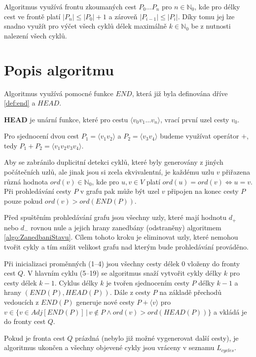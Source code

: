     Algoritmus využívá frontu zkoumaných cest $P_0 \dots P_n$ pro $n \in \mathbb{N}_0$, kde pro délky cest ve frontě platí $|P_n| \leq |P_0| + 1$ a zároveň $|P_{i-1}| \leq |P_{i}|$. Díky tomu jej lze snadno využít pro výčet všech cyklů délek maximálně $k \in \mathbb{N}_0$ be z nutnosti nalezení všech cyklů.

    \section{Popis algoritmu}
        Algoritmus využívá pomocné funkce $\mathit{END}$, která již byla definována dříve \ref{def:end} a $\mathit{HEAD}$.

        \begin{definition}
            \textbf{HEAD} je unární funkce, které pro cestu $\langle v_0 v_1 \dots v_n \rangle$, vrací první uzel cesty $v_0$.\\
        \end{definition}

        Pro sjednocení dvou cest $P_1 = \langle v_1v_2 \rangle$ a $P_2 = \langle v_3v_4 \rangle$ budeme využívat operátor $+$, tedy $P_1 + P_2 = \langle v_1v_2v_3v_4 \rangle$.

        Aby se zabránilo duplicitní detekci cyklů, které byly generovány z jiných počátečních uzlů, ale jinak jsou si zcela ekvivalentní, je každému uzlu $v$ přiřazena různá hodnota $ord(v) \in \mathbb{N}_0$, kde pro $u, v \in V$ platí $ord(u) = ord(v) \iff u = v$. Při prohledávání cesty $P$ v grafu pak může být uzel $v$ připojen na konec cesty $P$ pouze pokud $ord(v) > ord(END(P))$.

        Před spuštěním prohledávání grafu jsou všechny uzly, které mají hodnotu $d_+$ nebo $d_-$ rovnou nule a jejich hrany zanedbány (odstraněny) algoritmem \ref{algo:ZanedbaniStavu}. Cílem tohoto kroku je eliminovat uzly, které nemohou tvořit cykly a tím snížit velikost grafu nad kterým bude prohledávání prováděno.

        Při inicializaci proměnných (1--4) jsou všechny cesty délek 0 vloženy do fronty cest $Q$. V hlavním cyklu (5--19) se algoritmus snaží vytvořit cykly délky $k$ pro cesty délek $k-1$. Cyklus délky $k$ je tvořen sjednocením cesty $P$ délky $k-1$ a hrany $(END(P), HEAD(P))$. Dále z cesty $P$ na základě přechodů vedoucích z $END(P)$ generuje nové cesty $P + \langle v \rangle$ pro $v \in \{v \in Adj[END(P)] \,|\, v \notin P \land ord(v) > ord(HEAD(P))\}$ a vkládá je do fronty cest $Q$.

        Pokud je fronta cest $Q$ prázdná (nebylo již možné vygenerovat další cesty), je algoritmus ukončen a všechny objevené cykly jsou vráceny v seznamu $L_{cycles}$.

